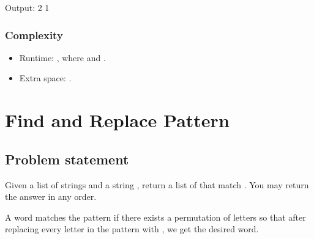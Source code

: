 \documentclass[letterpaper,12pt,english]{book}
\begin{document}
\begin{sphinxVerbatim}[commandchars=\\\{\}]
Output:
2
1
\end{sphinxVerbatim}


\subsubsection{Complexity}
\label{\detokenize{String/08_STR_804_Unique_Morse_Code_Words:complexity}}\begin{itemize}
\item {} 
\sphinxAtStartPar
Runtime: , where  and .

\item {} 
\sphinxAtStartPar
Extra space: .

\end{itemize}

\sphinxstepscope


\section{Find and Replace Pattern}
\label{\detokenize{String/08_STR_890_Find_and_Replace_Pattern:find-and-replace-pattern}}\label{\detokenize{String/08_STR_890_Find_and_Replace_Pattern::doc}}

\subsection{Problem statement\sphinxfootnotemark[37]}
\label{\detokenize{String/08_STR_890_Find_and_Replace_Pattern:problem-statement}}%
\begin{footnotetext}[37]\sphinxAtStartFootnote
{}
%
\end{footnotetext}\ignorespaces 
\sphinxAtStartPar
Given a list of strings  and a string , return a list of  that match . You may return the answer in any order.

\sphinxAtStartPar
A word matches the pattern if there exists a permutation of letters  so that after replacing every letter  in the pattern with , we get the desired word.
\end{document}

